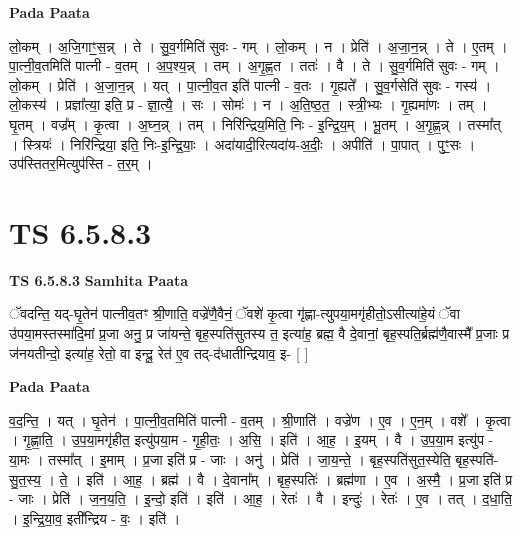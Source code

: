 \documentclass[17pt]{extarticle}
\begin{document}
\textbf{Pada Paata} \newline

लो॒कम् । अ॒जि॒गाꣳ॒॒स॒न्न् । ते । सु॒व॒र्गमिति॑ सुवः - गम् । लो॒कम् । न । प्रेति॑ । अ॒जा॒न॒न्न् । ते । ए॒तम् । पा॒त्नी॒व॒तमिति॑ पात्नी - व॒तम् । अ॒प॒श्य॒न्न् । तम् । अ॒गृ॒ह्ण॒त । ततः॑ । वै । ते । सु॒व॒र्गमिति॑ सुवः - गम् । लो॒कम् । प्रेति॑ । अ॒जा॒न॒न्न् । यत् । पा॒त्नी॒व॒त इति॑ पात्नी - व॒तः । गृ॒ह्यते᳚ । सु॒व॒र्गसेति॑ सुवः - गस्य॑ । लो॒कस्य॑ । प्रज्ञा᳚त्या॒ इति॒ प्र - ज्ञा॒त्यै॒ । सः । सोमः॑ । न । अ॒ति॒ष्ठ॒त॒ । स्त्री॒भ्यः । गृ॒ह्यमा॑णः । तम् । घृ॒तम् । वज्र᳚म् । कृ॒त्वा । अ॒घ्न॒न्न् । तम् । निरि॑न्द्रिय॒मिति॒ निः - इ॒न्द्रि॒य॒म् । भू॒तम् । अ॒गृ॒ह्ण॒न्न् । तस्मा᳚त् । स्त्रियः॑ । निरि॑न्द्रिया॒ इति॒ निः-इ॒न्द्रि॒याः॒ । अदा॑यादी॒रित्यदा॑य-अ॒दीः॒ । अपीति॑ । पा॒पात् । पुꣳ॒॒सः । उप॑स्तितर॒मित्युप॑स्ति - त॒र॒म् ।  \newline





\section{ TS 6.5.8.3 }

\textbf{TS 6.5.8.3 } \newline
\textbf{Samhita Paata} \newline

ॅवदन्ति॒ यद्-घृ॒तेन॑ पात्नीव॒तꣳ श्री॒णाति॒ वज्रे॑णै॒वैनं॒ ॅवशे॑ कृ॒त्वा गृ॑ह्णा-त्युपया॒मगृ॑हीतो॒ऽसीत्या॑हे॒यं ॅवा उ॑पया॒मस्तस्मा॑दि॒मां प्र॒जा अनु॒ प्र जा॑यन्ते॒ बृह॒स्पति॑सुतस्य त॒ इत्या॑ह॒ ब्रह्म॒ वै दे॒वानां॒ बृह॒स्पति॒र्ब्रह्म॑णै॒वास्मै᳚ प्र॒जाः प्र ज॑नयतीन्दो॒ इत्या॑ह॒ रेतो॒ वा इन्दू॒ रेत॑ ए॒व तद्-द॑धातीन्द्रियाव॒ इ- [  ] \newline

\textbf{Pada Paata} \newline

व॒द॒न्ति॒ । यत् । घृ॒तेन॑ । पा॒त्नी॒व॒तमिति॑ पात्नी - व॒तम् । श्री॒णाति॑ । वज्रे॑ण । ए॒व । ए॒न॒म् । वशे᳚ । कृ॒त्वा । गृ॒ह्णा॒ति॒ । उ॒प॒या॒मगृ॑हीत॒ इत्यु॑पया॒म - गृ॒ही॒तः॒ । अ॒सि॒ । इति॑ । आ॒ह॒ । इ॒यम् । वै । उ॒प॒या॒म इत्यु॑प - या॒मः । तस्मा᳚त् । इ॒माम् । प्र॒जा इति॑ प्र - जाः । अनु॑ । प्रेति॑ । जा॒य॒न्ते॒ । बृह॒स्पति॑सुत॒स्येति॒ बृह॒स्पति॑-सु॒त॒स्य॒ । ते॒ । इति॑ । आ॒ह॒ । ब्रह्म॑ । वै । दे॒वाना᳚म् । बृह॒स्पतिः॑ । ब्रह्म॑णा । ए॒व । अ॒स्मै॒ । प्र॒जा इति॑ प्र - जाः । प्रेति॑ । ज॒न॒य॒ति॒ । इ॒न्दो॒ इति॑ । इति॑ । आ॒ह॒ । रेतः॑ । वै । इन्दुः॑ । रेतः॑ । ए॒व । तत् । द॒धा॒ति॒ । इ॒न्द्रि॒या॒व॒ इती᳚न्द्रिय - वः॒ । इति॑ ।  \newline
\end{document}
